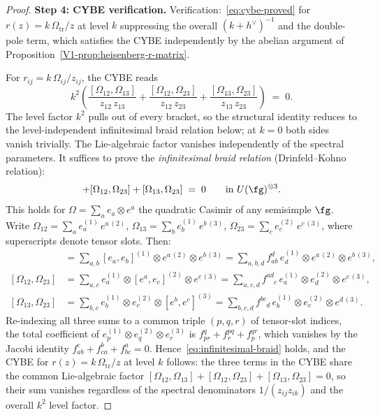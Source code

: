 \begin{proof}
\medskip
\noindent\textbf{Step 4: CYBE verification.}
Verification:~\eqref{eq:cybe-proved} for $r(z) = k\,\Omega_{\mathrm{tr}}/z$
at level $k$ suppressing the overall $(k+h^\vee)^{-1}$ and the double-pole term, which
satisfies the CYBE independently by the abelian argument of
Proposition~\ref{V1-prop:heisenberg-r-matrix}.

For $r_{ij} = k\,\Omega_{ij}/z_{ij}$, the CYBE reads
\[
k^2\left(
\frac{[\Omega_{12}, \Omega_{13}]}{z_{12}\, z_{13}}
+ \frac{[\Omega_{12}, \Omega_{23}]}{z_{12}\, z_{23}}
+ \frac{[\Omega_{13}, \Omega_{23}]}{z_{13}\, z_{23}}
\right)
\;=\; 0.
\]
The level factor $k^2$ pulls out of every bracket, so the
structural identity reduces to the level-independent
infinitesimal braid relation below; at $k = 0$ both sides
vanish trivially.
The Lie-algebraic factor vanishes
independently of the spectral parameters. It suffices to
prove the \emph{infinitesimal braid relation}
(Drinfeld--Kohno relation):
\begin{equation}%
[\Omega_{12}, \Omega_{13}]
+ [\Omega_{12}, \Omega_{23}]
+ [\Omega_{13}, \Omega_{23}]
\;=\; 0
\qquad \text{in } U(\fg)^{\otimes 3}.
\end{equation}
This holds for $\Omega = \sum_a e_a \otimes e^a$ the quadratic
Casimir of any semisimple $\fg$. Write
$\Omega_{12} = \sum_a e_a^{(1)}\, e^{a\,(2)}$,
$\Omega_{13} = \sum_b e_b^{(1)}\, e^{b\,(3)}$,
$\Omega_{23} = \sum_c e_c^{(2)}\, e^{c\,(3)}$,
where superscripts denote tensor slots. Then:
\begin{align*}
[\Omega_{12}, \Omega_{13}]
&= \sum_{a,b} [e_a, e_b]^{(1)} \otimes e^{a\,(2)} \otimes e^{b\,(3)}
= \sum_{a,b,d} f_{ab}^d\, e_d^{(1)} \otimes e^{a\,(2)}
 \otimes e^{b\,(3)}, \\
[\Omega_{12}, \Omega_{23}]
&= \sum_{a,c} e_a^{(1)} \otimes [e^a, e_c]^{(2)} \otimes e^{c\,(3)}
= \sum_{a,c,d} f^{ad}_{\phantom{ad}c}\, e_a^{(1)} \otimes e_d^{(2)}
 \otimes e^{c\,(3)}, \\
[\Omega_{13}, \Omega_{23}]
&= \sum_{b,c} e_b^{(1)} \otimes e_c^{(2)} \otimes [e^b, e^c]^{(3)}
= \sum_{b,c,d} f^{bc}_{\phantom{bc}d}\, e_b^{(1)} \otimes e_c^{(2)}
 \otimes e^{d\,(3)}.
\end{align*}
Re-indexing all three sums to a common triple $(p,q,r)$ of
tensor-slot indices, the total coefficient of
$e_p^{(1)} \otimes e_q^{(2)} \otimes e_r^{(3)}$ is
$f_{pr}^q + f^{pq}_r + f^{qr}_p$, which vanishes by the
Jacobi identity $f_{ab}^c + f_{ca}^b + f_{bc}^a = 0$.
Hence~\eqref{eq:infinitesimal-braid} holds, and the CYBE
for $r(z) = k\,\Omega_{\mathrm{tr}}/z$ at level $k$ follows: the three terms in the CYBE
share the common Lie-algebraic factor
$[\Omega_{12}, \Omega_{13}] + [\Omega_{12}, \Omega_{23}]
+ [\Omega_{13}, \Omega_{23}] = 0$,
so their sum vanishes regardless of the spectral denominators
$1/(z_{ij}z_{ik})$ and the overall $k^2$ level factor.
\end{proof}

